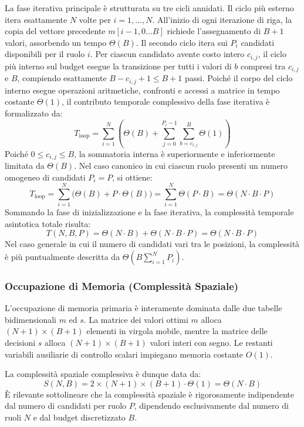 La fase iterativa principale è strutturata su tre cicli annidati. Il ciclo più esterno itera esattamente $N$ volte per $i = 1, \dots, N$. All'inizio di ogni iterazione di riga, la copia del vettore precedente $m[i-1, 0 \dots B]$ richiede l'assegnamento di $B + 1$ valori, assorbendo un tempo $\Theta(B)$. Il secondo ciclo itera sui $P_i$ candidati disponibili per il ruolo $i$. Per ciascun candidato avente costo intero $c_{i,j}$, il ciclo più interno sul budget esegue la transizione per tutti i valori di $b$ compresi tra $c_{i,j}$ e $B$, compiendo esattamente $B - c_{i,j} + 1 \le B + 1$ passi. Poiché il corpo del ciclo interno esegue operazioni aritmetiche, confronti e accessi a matrice in tempo costante $\Theta(1)$, il contributo temporale complessivo della fase iterativa è formalizzato da:
\begin{equation}
	T_{\text{loop}} = \sum_{i=1}^N \left( \Theta(B) + \sum_{j=0}^{P_i - 1} \sum_{b=c_{i,j}}^B \Theta(1) \right)
\end{equation}
Poiché $0 \le c_{i,j} \le B$, la sommatoria interna è superiormente e inferiormente limitata da $\Theta(B)$. Nel caso canonico in cui ciascun ruolo presenti un numero omogeneo di candidati $P_i = P$, si ottiene:
\begin{equation}
	T_{\text{loop}} = \sum_{i=1}^N \Big( \Theta(B) + P \cdot \Theta(B) \Big) = \sum_{i=1}^N \Theta(P \cdot B) = \Theta(N \cdot B \cdot P)
\end{equation}
Sommando la fase di inizializzazione e la fase iterativa, la complessità temporale asintotica totale risulta:
\begin{equation}
	T(N, B, P) = \Theta(N \cdot B) + \Theta(N \cdot B \cdot P) = \Theta(N \cdot B \cdot P)
\end{equation}
Nel caso generale in cui il numero di candidati vari tra le posizioni, la complessità è più puntualmente descritta da $\Theta(B \sum_{i=1}^N P_i)$.

\subsubsection{Occupazione di Memoria (Complessità Spaziale)}
L'occupazione di memoria primaria è interamente dominata dalle due tabelle bidimensionali $m$ ed $s$. La matrice dei valori ottimi $m$ alloca $(N + 1) \times (B + 1)$ elementi in virgola mobile, mentre la matrice delle decisioni $s$ alloca $(N + 1) \times (B + 1)$ valori interi con segno. Le restanti variabili ausiliarie di controllo scalari impiegano memoria costante $O(1)$.

La complessità spaziale complessiva è dunque data da:
\begin{equation}
	S(N, B) = 2 \times (N + 1) \times (B + 1) \cdot \Theta(1) = \Theta(N \cdot B)
\end{equation}
È rilevante sottolineare che la complessità spaziale è rigorosamente indipendente dal numero di candidati per ruolo $P$, dipendendo esclusivamente dal numero di ruoli $N$ e dal budget discretizzato $B$.
